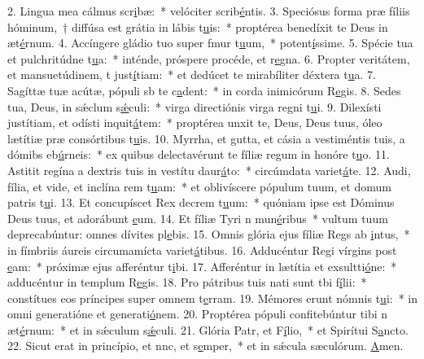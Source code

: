 2. Lingua mea cálmus scr\uline{i}bæ:~* velóciter scrib\uline{é}ntis.
3. Speciósus forma præ fíliis hóminum,~† diffúsa est grátia in lábis t\uline{u}is:~* proptérea benedíxit te Deus in æt\uline{é}rnum.
4. Accíngere gládio tuo super fmur t\uline{u}um,~* potent\uline{í}ssime.
5. Spécie tua et pulchritúdne t\uline{u}a:~* inténde, próspere procéde, et r\uline{e}gna.
6. Propter veritátem, et mansuetúdinem, t just\uline{í}tiam:~* et dedúcet te mirabíliter déxtera t\uline{u}a.
7. Sagíttæ tuæ acútæ, pópuli sb te c\uline{a}dent:~* in corda inimicórum R\uline{e}gis.
8. Sedes tua, Deus, in sǽclum s\uline{ǽ}culi:~* virga directiónis virga regni t\uline{u}i.
9. Dilexísti justítiam, et odísti inquit\uline{á}tem:~* proptérea unxit te, Deus, Deus tuus, óleo lætítiæ præ consórtibus t\uline{u}is.
10. Myrrha, et gutta, et cásia a vestiméntis tuis, a dómibs eb\uline{ú}rneis:~* ex quibus delectavérunt te fíliæ regum in honóre t\uline{u}o.
11. Astitit regína a dextris tuis in vestítu daur\uline{á}to:~* circúmdata variet\uline{á}te.
12. Audi, fília, et vide, et inclína rem t\uline{u}am:~* et oblivíscere pópulum tuum, et domum patris t\uline{u}i.
13. Et concupíscet Rex decrem t\uline{u}um:~* quóniam ipse est Dóminus Deus tuus, et adorábunt \uline{e}um.
14. Et fíliæ Tyri n mun\uline{é}ribus~* vultum tuum deprecabúntur: omnes dívites pl\uline{e}bis.
15. Omnis glória ejus fíliæ Regs ab \uline{i}ntus,~* in fímbriis áureis circumamícta variet\uline{á}tibus.
16. Adducéntur Regi vírgins post \uline{e}am:~* próximæ ejus afferéntur t\uline{i}bi.
17. Afferéntur in lætítia et exsultti\uline{ó}ne:~* adducéntur in templum R\uline{e}gis.
18. Pro pátribus tuis nati sunt tbi f\uline{í}lii:~* constítues eos príncipes super omnem t\uline{e}rram.
19. Mémores erunt nómnis t\uline{u}i:~* in omni generatióne et generati\uline{ó}nem.
20. Proptérea pópuli confitebúntur tibi n æt\uline{é}rnum:~* et in sǽculum s\uline{ǽ}culi.
21. Glória Patr, et F\uline{í}lio,~* et Spirítui S\uline{a}ncto.
22. Sicut erat in princípio, et nnc, et s\uline{e}mper,~* et in sǽcula sæculórum. \uline{A}men.
